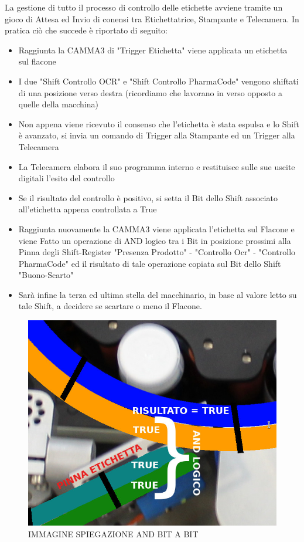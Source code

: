 \documentclass[12pt, a4paper, oneside]{book}
\begin{document}
La gestione di tutto il processo di controllo delle etichette avviene tramite un gioco di Attesa ed Invio di conensi tra Etichettatrice, Stampante e Telecamera. In pratica ciò che succede è riportato di seguito:
\begin{itemize}
	\item Raggiunta la CAMMA3 di "Trigger Etichetta" viene applicata un etichetta sul flacone
	\item I due "Shift Controllo OCR" e "Shift Controllo PharmaCode" vengono shiftati di una posizione verso destra (ricordiamo che lavorano in verso opposto a quelle della macchina)
	\item Non appena viene ricevuto il consenso che l'etichetta è stata espulsa e lo Shift è avanzato, si invia un comando di Trigger alla Stampante ed un Trigger alla Telecamera
	\item La Telecamera elabora il suo programma interno e restituisce sulle sue uscite digitali l'esito del controllo
	\item Se il risultato del controllo è positivo, si setta il Bit dello Shift associato all'etichetta appena controllata a True
	\item Raggiunta nuovamente la CAMMA3 viene applicata l'etichetta sul Flacone e viene Fatto un operazione di AND logico tra i Bit in posizione prossimi alla Pinna degli Shift-Register "Presenza Prodotto" - "Controllo Ocr" - "Controllo PharmaCode" ed il risultato di tale operazione copiata sul Bit dello Shift "Buono-Scarto"
	\item Sarà infine la terza ed ultima stella del macchinario, in base al valore letto su tale Shift, a decidere se scartare o meno il Flacone. 
\end{itemize}

\begin{figure}[H]
	\centering
	\includegraphics[width=12cm]{Immagini/SH7}
	\caption{IMMAGINE SPIEGAZIONE AND BIT A BIT}
	\label{sh7}
\end{figure}
\end{document}
